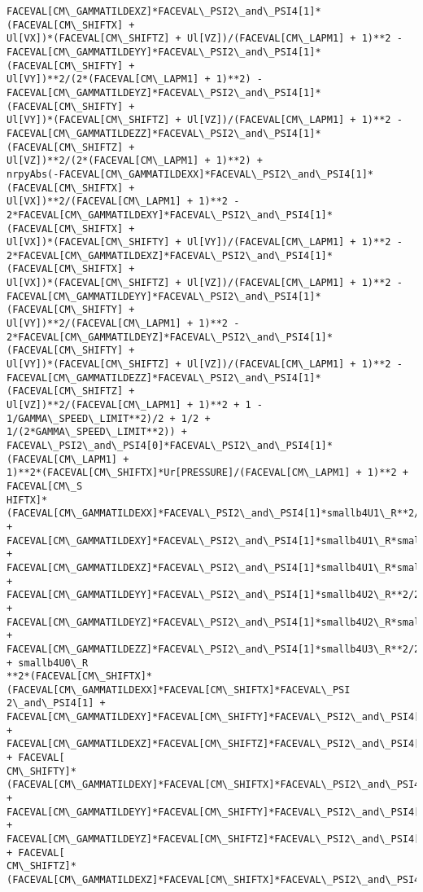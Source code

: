 \documentclass[landscape,letterpaper,10pt,english]{article}
\begin{document}
\begin{Verbatim}[commandchars=\\\{\}]
FACEVAL[CM\_GAMMATILDEXZ]*FACEVAL\_PSI2\_and\_PSI4[1]*(FACEVAL[CM\_SHIFTX] +
Ul[VX])*(FACEVAL[CM\_SHIFTZ] + Ul[VZ])/(FACEVAL[CM\_LAPM1] + 1)**2 -
FACEVAL[CM\_GAMMATILDEYY]*FACEVAL\_PSI2\_and\_PSI4[1]*(FACEVAL[CM\_SHIFTY] +
Ul[VY])**2/(2*(FACEVAL[CM\_LAPM1] + 1)**2) -
FACEVAL[CM\_GAMMATILDEYZ]*FACEVAL\_PSI2\_and\_PSI4[1]*(FACEVAL[CM\_SHIFTY] +
Ul[VY])*(FACEVAL[CM\_SHIFTZ] + Ul[VZ])/(FACEVAL[CM\_LAPM1] + 1)**2 -
FACEVAL[CM\_GAMMATILDEZZ]*FACEVAL\_PSI2\_and\_PSI4[1]*(FACEVAL[CM\_SHIFTZ] +
Ul[VZ])**2/(2*(FACEVAL[CM\_LAPM1] + 1)**2) +
nrpyAbs(-FACEVAL[CM\_GAMMATILDEXX]*FACEVAL\_PSI2\_and\_PSI4[1]*(FACEVAL[CM\_SHIFTX] +
Ul[VX])**2/(FACEVAL[CM\_LAPM1] + 1)**2 -
2*FACEVAL[CM\_GAMMATILDEXY]*FACEVAL\_PSI2\_and\_PSI4[1]*(FACEVAL[CM\_SHIFTX] +
Ul[VX])*(FACEVAL[CM\_SHIFTY] + Ul[VY])/(FACEVAL[CM\_LAPM1] + 1)**2 -
2*FACEVAL[CM\_GAMMATILDEXZ]*FACEVAL\_PSI2\_and\_PSI4[1]*(FACEVAL[CM\_SHIFTX] +
Ul[VX])*(FACEVAL[CM\_SHIFTZ] + Ul[VZ])/(FACEVAL[CM\_LAPM1] + 1)**2 -
FACEVAL[CM\_GAMMATILDEYY]*FACEVAL\_PSI2\_and\_PSI4[1]*(FACEVAL[CM\_SHIFTY] +
Ul[VY])**2/(FACEVAL[CM\_LAPM1] + 1)**2 -
2*FACEVAL[CM\_GAMMATILDEYZ]*FACEVAL\_PSI2\_and\_PSI4[1]*(FACEVAL[CM\_SHIFTY] +
Ul[VY])*(FACEVAL[CM\_SHIFTZ] + Ul[VZ])/(FACEVAL[CM\_LAPM1] + 1)**2 -
FACEVAL[CM\_GAMMATILDEZZ]*FACEVAL\_PSI2\_and\_PSI4[1]*(FACEVAL[CM\_SHIFTZ] +
Ul[VZ])**2/(FACEVAL[CM\_LAPM1] + 1)**2 + 1 - 1/GAMMA\_SPEED\_LIMIT**2)/2 + 1/2 +
1/(2*GAMMA\_SPEED\_LIMIT**2)) +
FACEVAL\_PSI2\_and\_PSI4[0]*FACEVAL\_PSI2\_and\_PSI4[1]*(FACEVAL[CM\_LAPM1] +
1)**2*(FACEVAL[CM\_SHIFTX]*Ur[PRESSURE]/(FACEVAL[CM\_LAPM1] + 1)**2 + FACEVAL[CM\_S
HIFTX]*(FACEVAL[CM\_GAMMATILDEXX]*FACEVAL\_PSI2\_and\_PSI4[1]*smallb4U1\_R**2/2 +
FACEVAL[CM\_GAMMATILDEXY]*FACEVAL\_PSI2\_and\_PSI4[1]*smallb4U1\_R*smallb4U2\_R +
FACEVAL[CM\_GAMMATILDEXZ]*FACEVAL\_PSI2\_and\_PSI4[1]*smallb4U1\_R*smallb4U3\_R +
FACEVAL[CM\_GAMMATILDEYY]*FACEVAL\_PSI2\_and\_PSI4[1]*smallb4U2\_R**2/2 +
FACEVAL[CM\_GAMMATILDEYZ]*FACEVAL\_PSI2\_and\_PSI4[1]*smallb4U2\_R*smallb4U3\_R +
FACEVAL[CM\_GAMMATILDEZZ]*FACEVAL\_PSI2\_and\_PSI4[1]*smallb4U3\_R**2/2 + smallb4U0\_R
**2*(FACEVAL[CM\_SHIFTX]*(FACEVAL[CM\_GAMMATILDEXX]*FACEVAL[CM\_SHIFTX]*FACEVAL\_PSI
2\_and\_PSI4[1] +
FACEVAL[CM\_GAMMATILDEXY]*FACEVAL[CM\_SHIFTY]*FACEVAL\_PSI2\_and\_PSI4[1] +
FACEVAL[CM\_GAMMATILDEXZ]*FACEVAL[CM\_SHIFTZ]*FACEVAL\_PSI2\_and\_PSI4[1]) + FACEVAL[
CM\_SHIFTY]*(FACEVAL[CM\_GAMMATILDEXY]*FACEVAL[CM\_SHIFTX]*FACEVAL\_PSI2\_and\_PSI4[1]
+ FACEVAL[CM\_GAMMATILDEYY]*FACEVAL[CM\_SHIFTY]*FACEVAL\_PSI2\_and\_PSI4[1] +
FACEVAL[CM\_GAMMATILDEYZ]*FACEVAL[CM\_SHIFTZ]*FACEVAL\_PSI2\_and\_PSI4[1]) + FACEVAL[
CM\_SHIFTZ]*(FACEVAL[CM\_GAMMATILDEXZ]*FACEVAL[CM\_SHIFTX]*FACEVAL\_PSI2\_and\_PSI4[1]

\end{Verbatim}
\end{document}

